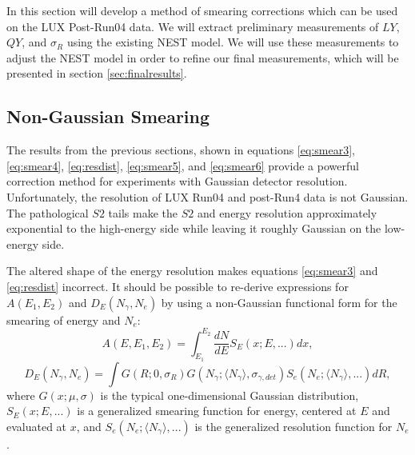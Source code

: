 In this section will develop a method of smearing corrections which can be used on the LUX Post-Run04 data. We will extract preliminary measurements of $LY$, $QY$, and $\sigma_R$ using the existing NEST model. We will use these measurements to adjust the NEST model in order to refine our final measurements, which will be presented in section \ref{sec:finalresults}. 

\subsection{Non-Gaussian Smearing}
The results from the previous sections, shown in equations \ref{eq:smear3}, \ref{eq:smear4}, \ref{eq:resdist}, \ref{eq:smear5}, and \ref{eq:smear6} provide a powerful correction method for experiments with Gaussian detector resolution. Unfortunately, the resolution of LUX Run04 and post-Run4 data is not Gaussian. The pathological $S2$ tails make the $S2$ and energy resolution approximately exponential to the high-energy side while leaving it roughly Gaussian on the low-energy side. 

The altered shape of the energy resolution makes equations \ref{eq:smear3} and \ref{eq:resdist} incorrect. It should be possible to re-derive expressions for $A(E_1,E_2)$ and $D_E(N_{\gamma},N_{e})$ by using a non-Gaussian functional form for the smearing of energy and $N_e$:
\begin{equation}
A(E,E_1,E_2)=\int_{E_1}^{E_2}\frac{dN}{dE}S_E(x;E,...)dx,
\end{equation}
\begin{equation}
D_E(N_{\gamma},N_{e})= \int G(R;0,\sigma_R)G(N_{\gamma};\langle N_{\gamma} \rangle,\sigma_{\gamma,det})S_e(N_e;\langle N_{\gamma} \rangle,...)dR,
\end{equation}
where $G(x;\mu,\sigma)$ is the typical one-dimensional Gaussian distribution, $S_E(x;E,...)$ is a generalized smearing function for energy, centered at $E$ and evaluated at $x$, and $S_e(N_e;\langle N_{\gamma} \rangle,...)$ is the generalized resolution function for $N_e$.

